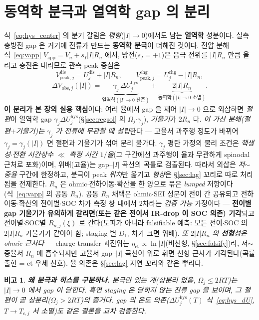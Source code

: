 \documentclass[11pt,a4paper]{article}
\newtheorem*{flagbox}{비고}
\newcommand{\app}{\mathrm{app}}
\newcommand{\dis}{\mathrm{dis}}
\newcommand{\chg}{\mathrm{chg}}
\newcommand{\hys}{\mathrm{hys}}
\begin{document}
\section{동역학 분극과 열역학 gap 의 분리}\label{sec:hys_pol}
식~\eqref{eq:hys_center} 의 분기 갈림은 \emph{평형}($|I|\to0$)에서도 남는 \textbf{열역학} 성분이다. 실측 충방전 gap 은
거기에 전류가 만드는 \textbf{동역학 분극}이 더해진 것이다. 전압 분해 식~\eqref{eq:vapp}
$V_\app=V_n+s_I|I|R_n$ 에서, 방전($s_I=+1$)은 음극 전위를 $|I|R_n$ 만큼 올리고 충전은 내리므로 관측 peak 중심은
\begin{equation}
V_{\mathrm{peak},j}^{\dis}=U_j^\dis+|I|R_n,\qquad V_{\mathrm{peak},j}^{\chg}=U_j^\chg-|I|R_n,
\label{eq:hys_obspeak}
\end{equation}
\begin{equation}
\boxed{\;\Delta V_{\mathrm{obs},j}(|I|)=\underbrace{\gamma_j\,\Delta U_j^\hys}_{\text{열역학}(|I|\to0\text{ 잔존})}
+\underbrace{2|I|R_n}_{\text{동역학}(|I|\to0\text{ 소멸})}.\;}
\label{eq:hys_obsgap}
\end{equation}
\textbf{이 분리가 본 장의 실용 핵심}이다: 여러 율에서 gap 을 재어 $|I|\to0$ 으로 외삽하면 \emph{절편}이 열역학
gap $\gamma_j\Delta U_j^\hys$(\S\ref{sec:regsol} 의 $\Omega_j$$\cdot$$\gamma_j$), \emph{기울기}가 $2R_n$ 다. \emph{이 가산
분해(절편$+$기울기)는 $\gamma_j$ 가 전류에 무관할 때 성립}한다 — 고율서 과주행 정도가 바뀌어 $\gamma_j=\gamma_j(|I|)$ 면
절편과 기울기가 섞여 분리 불가다. $\gamma_j$ 평탄 가정의 물리 조건은 \emph{핵생성$\cdot$전환 시간상수 $\ll$ 측정 시간
$1/$율}(그 구간에선 과주행이 율과 무관하게 spinodal 근처로 포화)이며, 위배(고율)는 gap–$|I|$ 곡선의 곡률로 검출된다.
따라서 외삽은 \emph{저$\sim$중율} 구간에 한정하고, 분극이 peak \emph{위치}만 옮기고 \emph{형상}은 \S\ref{sec:lag} 꼬리로
따로 처리됨을 전제한다.
$R_n$ 은 ohmic$\cdot$전하이동$\cdot$확산을 한 양으로 묶은 \emph{lumped} 저항이다(식~\eqref{eq:vapp} 의 공통 $R_n$).
공통 $R_n$ 채택은 ohmic$\cdot$SEI 성분이 전이 간 공유되고 전하이동$\cdot$확산의 전이별$\cdot$SOC 차가 측정 창 내에서
2차라는 \emph{검증 가능} 가정이다 — \textbf{전이별 gap 기울기가 유의하게 갈리면(또는 같은 전이서 IR-drop 이 SOC 의존)
기각}되고 전이별$\cdot$SOC별 $R_{n,j}(\xi)$ 로 간다(도피가 아니라 falsifiable 예측: 모든 전이$\cdot$SOC 의 $2|I|R_n$
기울기가 같아야 함; staging 별 $D_{\mathrm{Li}}$ 차가 크면 위배). \emph{또 $2|I|R_n$ 의 \textbf{선형}성은 ohmic 근사다} —
charge-transfer 과전위는 $\eta_\mathrm{ct}\propto\ln|I|$(비선형, \S\ref{sec:falsify})라, 저$\sim$중율서 $R_n$ 에 흡수되지만
고율서 gap–$|I|$ 곡선이 위로 휘면 선형 근사가 기각된다(곡률 출현 = ct 우세 신호). 율 의존은 \S\ref{sec:lag} 지연
꼬리와 같은 뿌리다.
\begin{flagbox}
\textbf{왜 분극과 히스를 구분하나.} 분극만 있는 계(상분리 없음, $\Omega_j\le2RT$)는 $|I|\to0$ 에서 gap 이 \emph{닫힌다}.
흑연 staging 은 닫히지 않는 잔류 gap 을 보이며, 그 절편이 곧 상분리($\Omega_j>2RT$)의 증거다. gap 의 \emph{온도}
의존($\Delta U_j^\hys(T)$ 식~\eqref{eq:hys_dU}, $T\to T_{c,j}$ 서 소멸)도 같은 결론을 교차 검증한다.
\end{flagbox}
\end{document}
